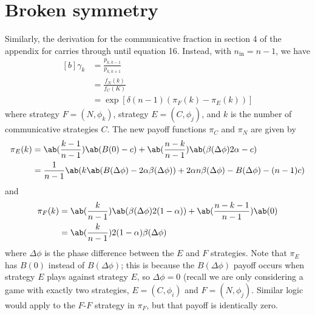 \section{Broken symmetry}
Similarly, the derivation for the communicative fraction
in section 4 of the appendix for \cite{tripp2022evolutionary} carries
through until equation 16.
Instead, with $n_{\text{in}} = n-1$, we have
\begin{equation}
  \begin{aligned}[b]
  \gamma_k &= \frac{p_{k,k-1}}{p_{k,k+1}} \\
           &= \frac{f_N(k)}{f_C(K)} \\
           &= \exp[\delta (n-1) (\pi_F(k) - \pi_E(k))]
\end{aligned}
\end{equation}
where strategy $F=(N,\phi_k)$, strategy $E=(C,\phi_j)$, and $k$ is the
number of communicative strategies $C$.
The new payoff functions $\pi_C$ and $\pi_N$ are given by
\begin{align}
  \pi_E(k) &= \ab(\frac{k-1}{n-1}) \ab(B(0) - c)
                + \ab(\frac{n-k}{n-1}) \ab(\beta(\Delta\phi) 2\alpha - c) \\
           &= \frac{1}{n-1}
               \ab(k \ab(B(\Delta\phi) - 2 \alpha \beta(\Delta\phi))
                 + 2 \alpha n \beta(\Delta\phi) - B(\Delta\phi) - (n-1) c)
\end{align}
and
\begin{align}
  \pi_F(k) &= \ab(\frac{k}{n-1}) \ab(\beta(\Delta\phi) 2 (1-\alpha))
                + \ab(\frac{n-k-1}{n-1}) \ab(0) \\
           &= \ab(\frac{k}{n-1}) 2 (1-\alpha) \beta(\Delta\phi)
\end{align}
where $\Delta \phi$ is the phase difference between the $E$ and $F$
strategies.
Note that $\pi_E$ has $B(0)$ instead of $B(\Delta \phi)$; this is
because the $B(\Delta \phi)$ payoff occurs when strategy $E$ plays
against strategy $E$, so $\Delta \phi = 0$ (recall we are only
considering a game with exactly two strategies, $E = (C, \phi_i)$ and
$F = (N, \phi_j)$.
Similar logic would apply to the $F$-$F$ strategy in $\pi_F$, but that
payoff is identically zero.

